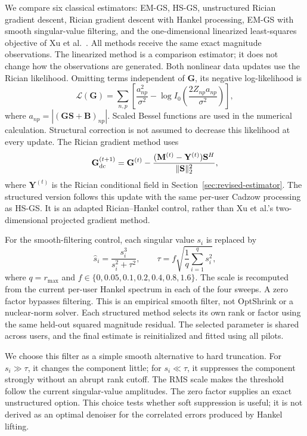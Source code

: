 \documentclass[journal]{IEEEtran}
\begin{document}
We compare six classical estimators: EM-GS, HS-GS, unstructured Rician
gradient descent, Rician gradient descent with Hankel processing, EM-GS
with smooth singular-value filtering, and the one-dimensional linearized
least-squares objective of Xu et al.~\cite{xu2025}. All methods receive
the same exact magnitude observations. The linearized method is a
comparison estimator; it does not change how the observations are generated.
Both nonlinear data updates use the Rician likelihood. Omitting terms
independent of $\mathbf G$, its negative log-likelihood is
\begin{equation}
\mathcal L(\mathbf G)=\sum_{n,p}\left[
\frac{a_{np}^{2}}{\sigma^2}
-\log I_0\!\left(\frac{2Z_{np}a_{np}}{\sigma^2}\right)\right],
\end{equation}
where $a_{np}=|(\mathbf G\mathbf S+\mathbf B)_{np}|$.
Scaled Bessel functions are used in the numerical calculation. Structural
correction is not assumed to decrease this likelihood at every update.
The Rician gradient method uses
\begin{equation}
\mathbf G^{(t+1)}_{\rm dc}
=\mathbf G^{(t)}-
\frac{(\mathbf M^{(t)}-\mathbf Y^{(t)})\mathbf S^H}
     {\|\mathbf S\|_2^2},
\end{equation}
where $\mathbf Y^{(t)}$ is the Rician conditional field in
Section~\ref{sec:revised-estimator}. The structured version follows this
update with the same per-user Cadzow processing as HS-GS. It is an adapted
Rician--Hankel control, rather than Xu et al.'s two-dimensional projected
gradient method.

For the smooth-filtering control, each singular value $s_i$ is replaced by
\begin{equation}
\widehat s_i=\frac{s_i^3}{s_i^2+\tau^2},
\qquad
\tau=f\sqrt{\frac{1}{q}\sum_{i=1}^{q}s_i^2},
\end{equation}
where $q=r_{\max}$ and
$f\in\{0,0.05,0.1,0.2,0.4,0.8,1.6\}$.
The scale is recomputed from the current per-user Hankel spectrum in each
of the four sweeps. A zero factor bypasses filtering. This is an empirical
smooth filter, not OptShrink or a nuclear-norm solver. Each structured
method selects its own rank or factor using the same held-out squared
magnitude residual. The selected parameter is shared across users, and
the final estimate is reinitialized and fitted using all pilots.

We choose this filter as a simple smooth alternative to hard truncation.
For $s_i\gg\tau$, it changes the component little; for $s_i\ll\tau$,
it suppresses the component strongly without an abrupt rank cutoff.
The RMS scale makes the threshold follow the current singular-value
amplitudes. The zero factor supplies an exact unstructured option. This
choice tests whether soft suppression is useful; it is not derived as an
optimal denoiser for the correlated errors produced by Hankel lifting.
\end{document}

